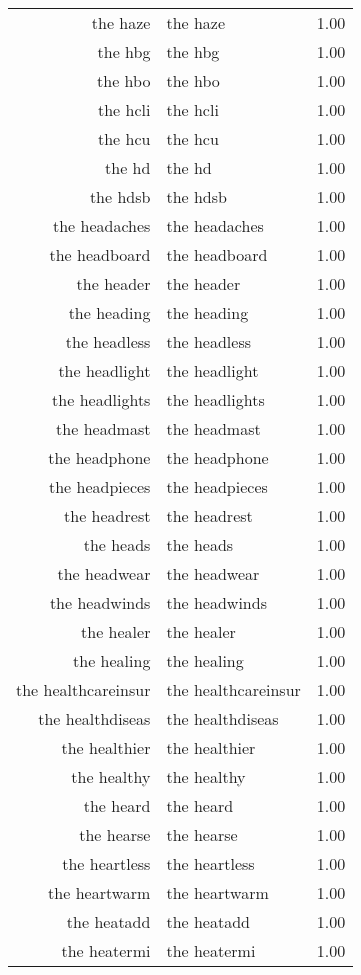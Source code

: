 \begin{table}[ht]
\begin{tabular}{rlr}
  the haze & the haze & 1.00 \\ 
  the hbg & the hbg & 1.00 \\ 
  the hbo & the hbo & 1.00 \\ 
  the hcli & the hcli & 1.00 \\ 
  the hcu & the hcu & 1.00 \\ 
  the hd & the hd & 1.00 \\ 
  the hdsb & the hdsb & 1.00 \\ 
  the headaches & the headaches & 1.00 \\ 
  the headboard & the headboard & 1.00 \\ 
  the header & the header & 1.00 \\ 
  the heading & the heading & 1.00 \\ 
  the headless & the headless & 1.00 \\ 
  the headlight & the headlight & 1.00 \\ 
  the headlights & the headlights & 1.00 \\ 
  the headmast & the headmast & 1.00 \\ 
  the headphone & the headphone & 1.00 \\ 
  the headpieces & the headpieces & 1.00 \\ 
  the headrest & the headrest & 1.00 \\ 
  the heads & the heads & 1.00 \\ 
  the headwear & the headwear & 1.00 \\ 
  the headwinds & the headwinds & 1.00 \\ 
  the healer & the healer & 1.00 \\ 
  the healing & the healing & 1.00 \\ 
  the healthcareinsur & the healthcareinsur & 1.00 \\ 
  the healthdiseas & the healthdiseas & 1.00 \\ 
  the healthier & the healthier & 1.00 \\ 
  the healthy & the healthy & 1.00 \\ 
  the heard & the heard & 1.00 \\ 
  the hearse & the hearse & 1.00 \\ 
  the heartless & the heartless & 1.00 \\ 
  the heartwarm & the heartwarm & 1.00 \\ 
  the heatadd & the heatadd & 1.00 \\ 
  the heatermi & the heatermi & 1.00 \\ 

\end{tabular}
\end{table}
